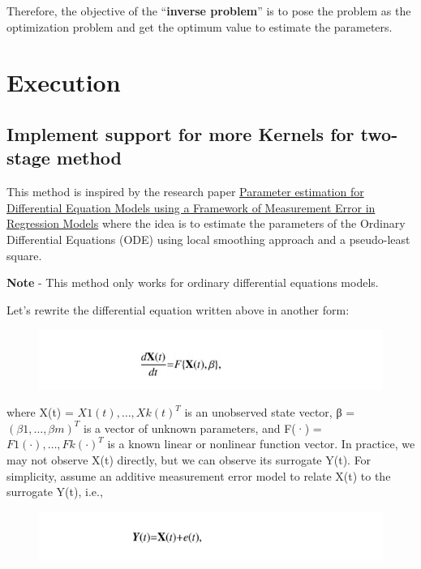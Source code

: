 \documentclass[11pt]{article}
\makeatletter
\def\maxwidth{\ifdim\Gin@nat@width>\linewidth\linewidth
    \else\Gin@nat@width\fi}
\let\Oldincludegraphics\includegraphics
\renewcommand{\includegraphics}[1]{\Oldincludegraphics[width=.8\maxwidth]{#1}}
\makeatother
\begin{document}
Therefore, the objective of the ``\textbf{inverse problem}'' is to pose
the problem as the optimization problem and get the optimum value to
estimate the parameters.

    \section{Execution}\label{execution}

\subsection{Implement support for more Kernels for two-stage
method}\label{implement-support-for-more-kernels-for-two-stage-method}

This method is inspired by the research paper
\href{https://www.ncbi.nlm.nih.gov/pmc/articles/PMC2631937/}{Parameter
estimation for Differential Equation Models using a Framework of
Measurement Error in Regression Models} where the idea is to estimate
the parameters of the Ordinary Differential Equations (ODE) using local
smoothing approach and a pseudo-least square.

\textbf{Note} - This method only works for ordinary differential
equations models.

Let's rewrite the differential equation written above in another form:

\begin{figure}[htbp]
\centering
\includegraphics{images/2_stage_form_ODE.png}
\caption{}
\end{figure}

where X(t) = \({ X1(t), …, Xk(t)}^{T}\) is an unobserved state vector, β
= \((β1, …, βm)^{T}\) is a vector of unknown parameters, and F(·) =
\({F1(·), …, Fk(·)}^{T}\) is a known linear or nonlinear function
vector. In practice, we may not observe X(t) directly, but we can
observe its surrogate Y(t). For simplicity, assume an additive
measurement error model to relate X(t) to the surrogate Y(t), i.e.,

\begin{figure}[htbp]
\centering
\includegraphics{images/2_stage_form_Y.png}
\caption{}
\end{figure}
\end{document}
